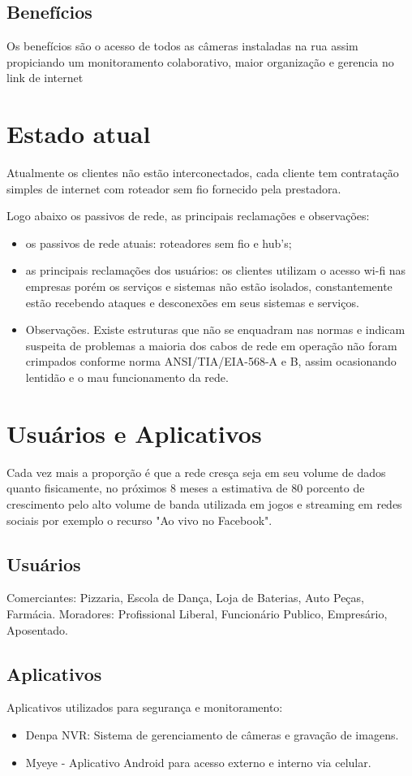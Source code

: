\documentclass[	DIV=calc,%
							paper=a4,%
							fontsize=12pt,%
							onecolumn]{scrartcl}	 					%
\begin{document}
\subsection{Benefícios}
Os benefícios são o acesso de todos as câmeras instaladas na rua assim propiciando um monitoramento colaborativo, maior organização e gerencia no link de internet

\section{Estado atual}
Atualmente os clientes não estão interconectados, cada cliente tem contratação simples de internet com roteador sem fio fornecido pela prestadora.

Logo abaixo os passivos de rede, as principais reclamações e observações:
\begin{itemize}
	\item os passivos de rede atuais: roteadores sem fio e hub's;
	\item as principais reclamações dos usuários: os clientes utilizam o acesso wi-fi nas empresas porém os serviços e sistemas não estão isolados, constantemente estão recebendo ataques e desconexões em seus sistemas e serviços.
	\item Observações. Existe estruturas que não se enquadram nas normas e indicam suspeita de problemas a maioria dos cabos de rede em operação não foram crimpados conforme norma ANSI/TIA/EIA-568-A e B, assim ocasionando lentidão e o mau funcionamento da rede.
\end{itemize}


\section{Usuários e Aplicativos}
Cada vez mais a proporção é que a rede cresça seja em seu volume de dados quanto fisicamente, no próximos 8 meses a estimativa de 80 porcento de crescimento pelo alto volume de banda utilizada em jogos e streaming em redes sociais por exemplo o recurso "Ao vivo no Facebook".

\subsection{Usuários}
Comerciantes: Pizzaria, Escola de Dança, Loja de Baterias, Auto Peças, Farmácia. 
Moradores: Profissional Liberal, Funcionário Publico, Empresário, Aposentado.


\subsection{Aplicativos}
Aplicativos utilizados para segurança e monitoramento:
\begin{itemize}
	\item Denpa NVR: Sistema de gerenciamento de câmeras e gravação de imagens.
	\item Myeye - Aplicativo Android para acesso externo e interno via celular.
\end{itemize}
\end{document}
